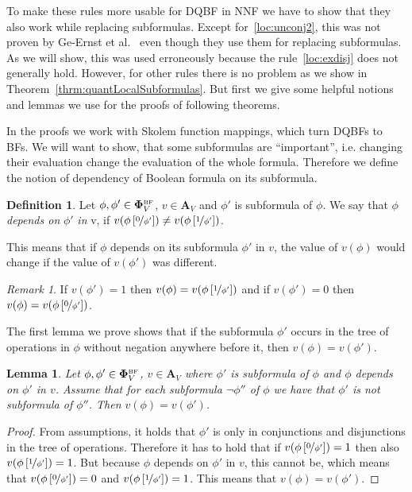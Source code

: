 \documentclass[
  digital, %
  color,
  twoside, %
  table,   %
  nolof,     %
  nolot,     %
]{fithesis3}
\newtheorem{lemma}[theorem]{Lemma}         %
\theoremstyle{definition}
\newtheorem{definition}{Definition}
\theoremstyle{remark}
\newtheorem*{remark}{Remark}
\newcommand{\substitute}[2]{\left[ \nicefrac{#2}{#1} \right]}
\newcommand{\BF}[1]{\mathbf{\Phi}_{#1}^{\normalfont{\text{\tiny BF}}}}
\newcommand{\valtns}[1]{\mathbf{A}_{#1}}
\begin{document}
To make these rules more usable for DQBF in NNF we have to show that they also work while replacing subformulas. Except for~\eqref{loc:unconj2}, this was not proven by Ge-Ernst et al.~\cite{HQSquantifierLocalisation} even though they use them for replacing subformulas. As we will show, this was used erroneously because the rule~\eqref{loc:exdisj} does not generally hold. However, for other rules there is no problem as we show in Theorem~\ref{thrm:quantLocalSubformulas}. But first we give some helpful notions and lemmas we use for the proofs of following theorems.

In the proofs we work with Skolem function mappings, which turn DQBFs to BFs. We will want to show, that some subformulas are ``important'', i.e. changing their evaluation change the evaluation of the whole formula. Therefore we define the notion of dependency of Boolean formula on its subformula.
\begin{definition}
  Let $\phi, \phi' \in \BF{V}$, $v \in \valtns{V}$ and $\phi'$ is subformula of $\phi$. We say that $\phi$ \emph{depends on} $\phi'$ \emph{in} v, if $v(\phi\substitute{\phi'}{0}) \not= v(\phi\substitute{\phi'}{1})$.
\end{definition}
This means that if $\phi$ depends on its subformula $\phi'$ in $v$, the value of $v(\phi)$ would change if the value of $v(\phi')$ was different.

\begin{remark}
  If $v(\phi') = 1$ then $v(\phi) = v(\phi\substitute{\phi'}{1})$ and if $v(\phi') = 0$ then $v(\phi) = v(\phi\substitute{\phi'}{0})$.
\end{remark}

The first lemma we prove shows that if the subformula $\phi'$ occurs in the tree of operations in $\phi$ without negation anywhere before it, then $v(\phi) = v(\phi')$.
\begin{lemma}
  \label{lemma:nonegdepends}
  Let $\phi, \phi' \in \BF{V}$, $v \in \valtns{V}$ where $\phi'$ is subformula of $\phi$ and $\phi$ depends on $\phi'$ in $v$. Assume that for each subformula $\neg \phi''$ of $\phi$ we have that $\phi'$ is not subformula of $\phi''$. Then $v(\phi) = v(\phi')$.
\end{lemma}
\begin{proof}
  From assumptions, it holds that $\phi'$ is only in conjunctions and disjunctions in the tree of operations. Therefore it has to hold that if $v(\phi\substitute{\phi'}{0}) = 1$ then also $v(\phi\substitute{\phi'}{1}) = 1$. But because $\phi$ depends on $\phi'$ in $v$, this cannot be, which means that $v(\phi\substitute{\phi'}{0}) = 0$ and $v(\phi\substitute{\phi'}{1}) = 1$. This means that $v(\phi) = v(\phi')$.
\end{proof}
\end{document}
